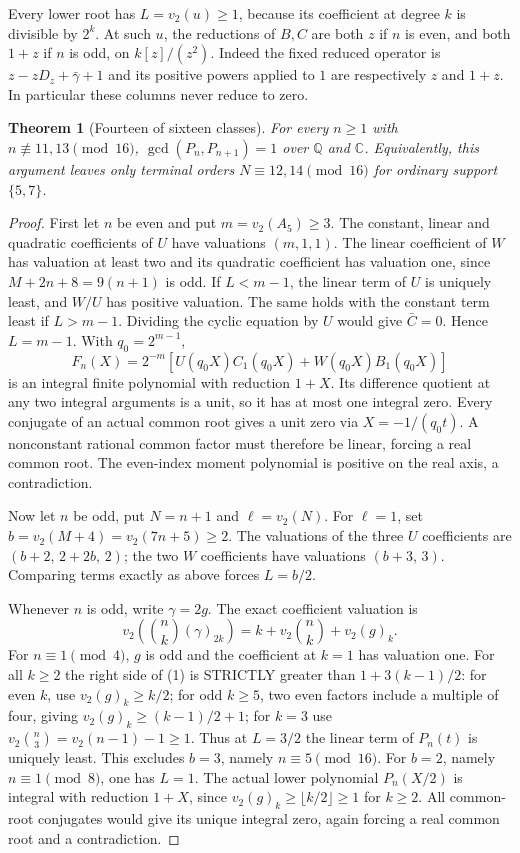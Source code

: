 \documentclass[11pt]{article}
\newtheorem{theorem}[lemma]{Theorem}
\begin{document}
Every lower root has $L=v_2(u)\ge1$, because its coefficient at
degree $k$ is divisible by $2^k$.
At such $u$, the reductions of $B,C$ are both $z$ if $n$ is even,
and both $1+z$ if $n$ is odd, on $k[z]/(z^2)$.
Indeed the fixed reduced operator is
$z-zD_z+\bar\gamma+1$ and its positive powers applied to $1$
are respectively $z$ and $1+z$. In particular these columns never
reduce to zero.

\begin{theorem}[Fourteen of sixteen classes]\label{thm:residues}
For every $n\ge1$ with $n\not\equiv11,13\pmod{16}$,
$\gcd(P_n,P_{n+1})=1$ over $\mathbb Q$ and $\mathbb C$.
Equivalently, this argument leaves only terminal orders
$N\equiv12,14\pmod{16}$ for ordinary support $\{5,7\}$.
\end{theorem}
\begin{proof}
First let $n$ be even and put $m=v_2(A_5)\ge3$.
The constant, linear and quadratic coefficients of $U$ have
valuations $(m,1,1)$.
The linear coefficient of $W$ has valuation at least two and
its quadratic coefficient has valuation one, since
$M+2n+8=9(n+1)$ is odd.
If $L<m-1$, the linear term of $U$ is uniquely least, and
$W/U$ has positive valuation. The same holds with the constant
term least if $L>m-1$. Dividing the cyclic equation by $U$
would give $\bar C=0$. Hence $L=m-1$.
With $q_0=2^{m-1}$,
\[
 F_n(X)=2^{-m}[U(q_0X)C_1(q_0X)+W(q_0X)B_1(q_0X)]
\]
is an integral finite polynomial with reduction $1+X$.
Its difference quotient at any two integral arguments is a unit,
so it has at most one integral zero. Every conjugate of an actual
common root gives a unit zero via $X=-1/(q_0t)$.
A nonconstant rational common factor must therefore be linear,
forcing a real common root. The even-index moment polynomial
is positive on the real axis, a contradiction.

Now let $n$ be odd, put $N=n+1$ and $\ell=v_2(N)$.
For $\ell=1$, set $b=v_2(M+4)=v_2(7n+5)\ge2$.
The valuations of the three $U$ coefficients are
$(b+2,\,2+2b,\,2)$; the two $W$ coefficients have valuations
$(b+3,\,3)$. Comparing terms exactly as above forces $L=b/2$.

Whenever $n$ is odd, write $\gamma=2g$. The exact coefficient valuation is
\[
 v_2\!\left(\binom nk(\gamma)_{2k}\right)
   =k+v_2\binom nk+v_2(g)_k.                       \tag{1}
\]
For $n\equiv1\pmod4$, $g$ is odd and the coefficient at
$k=1$ has valuation one. For all $k\ge2$
the right side of (1) is STRICTLY greater than
$1+3(k-1)/2$: for even $k$, use $v_2(g)_k\ge k/2$;
for odd $k\ge5$, two even factors include a multiple of four,
giving $v_2(g)_k\ge(k-1)/2+1$; for $k=3$ use
$v_2\binom n3=v_2(n-1)-1\ge1$.
Thus at $L=3/2$ the linear term of $P_n(t)$ is uniquely least.
This excludes $b=3$, namely $n\equiv5\pmod{16}$.
For $b=2$, namely $n\equiv1\pmod8$, one has $L=1$.
The actual lower polynomial $P_n(X/2)$ is integral with reduction
$1+X$, since $v_2(g)_k\ge\lfloor k/2\rfloor\ge1$ for $k\ge2$.
All common-root conjugates would give its unique integral zero,
again forcing a real common root and a contradiction.


\end{proof}
\end{document}
